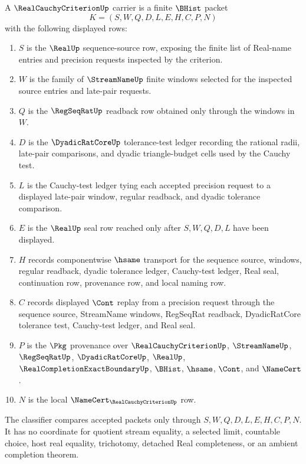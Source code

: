 \begin{definition}
\label{def:real-cauchy-criterion-carrier}
A $\RealCauchyCriterionUp$ carrier is a finite $\BHist$ packet
$$
K=(S,W,Q,D,L,E,H,C,P,N)
$$
with the following displayed rows:
\begin{enumerate}
\item $S$ is the $\RealUp$ sequence-source row, exposing the finite list of Real-name entries and precision requests inspected by the criterion.
\item $W$ is the family of $\StreamNameUp$ finite windows selected for the inspected source entries and late-pair requests.
\item $Q$ is the $\RegSeqRatUp$ readback row obtained only through the windows in $W$.
\item $D$ is the $\DyadicRatCoreUp$ tolerance-test ledger recording the rational radii, late-pair comparisons, and dyadic triangle-budget cells used by the Cauchy test.
\item $L$ is the Cauchy-test ledger tying each accepted precision request to a displayed late-pair window, regular readback, and dyadic tolerance comparison.
\item $E$ is the $\RealUp$ seal row reached only after $S,W,Q,D,L$ have been displayed.
\item $H$ records componentwise $\hsame$ transport for the sequence source, windows, regular readback, dyadic tolerance ledger, Cauchy-test ledger, Real seal, continuation row, provenance row, and local naming row.
\item $C$ records displayed $\Cont$ replay from a precision request through the sequence source, StreamName windows, RegSeqRat readback, DyadicRatCore tolerance test, Cauchy-test ledger, and Real seal.
\item $P$ is the $\Pkg$ provenance over $\RealCauchyCriterionUp$, $\StreamNameUp$, $\RegSeqRatUp$, $\DyadicRatCoreUp$, $\RealUp$, $\RealCompletionExactBoundaryUp$, $\BHist$, $\hsame$, $\Cont$, and $\NameCert$.
\item $N$ is the local $\NameCert_{\RealCauchyCriterionUp}$ row.
\end{enumerate}
The classifier compares accepted packets only through $S,W,Q,D,L,E,H,C,P,N$. It has no coordinate for quotient stream equality, a selected limit, countable choice, host real equality, trichotomy, detached Real completeness, or an ambient completion theorem.
\end{definition}

